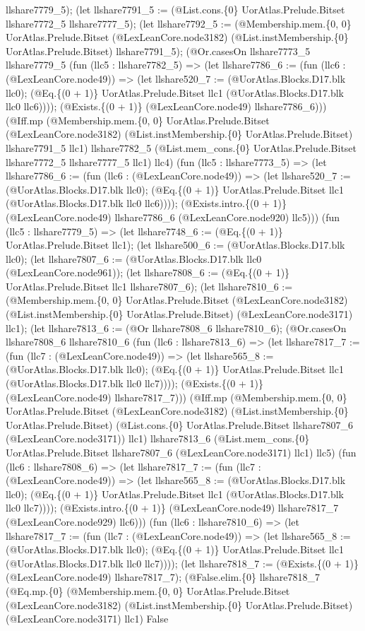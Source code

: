 \documentclass[11pt]{article}
\begin{document}
llshare7779\_5); (let llshare7791\_5 := (@List.cons.\{0\} UorAtlas.Prelude.Bitset llshare7772\_5 llshare7777\_5); (let llshare7792\_5 := (@Membership.mem.\{0, 0\} UorAtlas.Prelude.Bitset (@LexLeanCore.node3182) (@List.instMembership.\{0\} UorAtlas.Prelude.Bitset) llshare7791\_5); (@Or.casesOn llshare7773\_5 llshare7779\_5 (fun (llc5 : llshare7782\_5) => (let llshare7786\_6 := (fun (llc6 : (@LexLeanCore.node49)) => (let llshare520\_7 := (@UorAtlas.Blocks.D17.blk llc0); (@Eq.\{(0 + 1)\} UorAtlas.Prelude.Bitset llc1 (@UorAtlas.Blocks.D17.blk llc0 llc6)))); (@Exists.\{(0 + 1)\} (@LexLeanCore.node49) llshare7786\_6))) (@Iff.mp (@Membership.mem.\{0, 0\} UorAtlas.Prelude.Bitset (@LexLeanCore.node3182) (@List.instMembership.\{0\} UorAtlas.Prelude.Bitset) llshare7791\_5 llc1) llshare7782\_5 (@List.mem\_cons.\{0\} UorAtlas.Prelude.Bitset llshare7772\_5 llshare7777\_5 llc1) llc4) (fun (llc5 : llshare7773\_5) => (let llshare7786\_6 := (fun (llc6 : (@LexLeanCore.node49)) => (let llshare520\_7 := (@UorAtlas.Blocks.D17.blk llc0); (@Eq.\{(0 + 1)\} UorAtlas.Prelude.Bitset llc1 (@UorAtlas.Blocks.D17.blk llc0 llc6)))); (@Exists.intro.\{(0 + 1)\} (@LexLeanCore.node49) llshare7786\_6 (@LexLeanCore.node920) llc5))) (fun (llc5 : llshare7779\_5) => (let llshare7748\_6 := (@Eq.\{(0 + 1)\} UorAtlas.Prelude.Bitset llc1); (let llshare500\_6 := (@UorAtlas.Blocks.D17.blk llc0); (let llshare7807\_6 := (@UorAtlas.Blocks.D17.blk llc0 (@LexLeanCore.node961)); (let llshare7808\_6 := (@Eq.\{(0 + 1)\} UorAtlas.Prelude.Bitset llc1 llshare7807\_6); (let llshare7810\_6 := (@Membership.mem.\{0, 0\} UorAtlas.Prelude.Bitset (@LexLeanCore.node3182) (@List.instMembership.\{0\} UorAtlas.Prelude.Bitset) (@LexLeanCore.node3171) llc1); (let llshare7813\_6 := (@Or llshare7808\_6 llshare7810\_6); (@Or.casesOn llshare7808\_6 llshare7810\_6 (fun (llc6 : llshare7813\_6) => (let llshare7817\_7 := (fun (llc7 : (@LexLeanCore.node49)) => (let llshare565\_8 := (@UorAtlas.Blocks.D17.blk llc0); (@Eq.\{(0 + 1)\} UorAtlas.Prelude.Bitset llc1 (@UorAtlas.Blocks.D17.blk llc0 llc7)))); (@Exists.\{(0 + 1)\} (@LexLeanCore.node49) llshare7817\_7))) (@Iff.mp (@Membership.mem.\{0, 0\} UorAtlas.Prelude.Bitset (@LexLeanCore.node3182) (@List.instMembership.\{0\} UorAtlas.Prelude.Bitset) (@List.cons.\{0\} UorAtlas.Prelude.Bitset llshare7807\_6 (@LexLeanCore.node3171)) llc1) llshare7813\_6 (@List.mem\_cons.\{0\} UorAtlas.Prelude.Bitset llshare7807\_6 (@LexLeanCore.node3171) llc1) llc5) (fun (llc6 : llshare7808\_6) => (let llshare7817\_7 := (fun (llc7 : (@LexLeanCore.node49)) => (let llshare565\_8 := (@UorAtlas.Blocks.D17.blk llc0); (@Eq.\{(0 + 1)\} UorAtlas.Prelude.Bitset llc1 (@UorAtlas.Blocks.D17.blk llc0 llc7)))); (@Exists.intro.\{(0 + 1)\} (@LexLeanCore.node49) llshare7817\_7 (@LexLeanCore.node929) llc6))) (fun (llc6 : llshare7810\_6) => (let llshare7817\_7 := (fun (llc7 : (@LexLeanCore.node49)) => (let llshare565\_8 := (@UorAtlas.Blocks.D17.blk llc0); (@Eq.\{(0 + 1)\} UorAtlas.Prelude.Bitset llc1 (@UorAtlas.Blocks.D17.blk llc0 llc7)))); (let llshare7818\_7 := (@Exists.\{(0 + 1)\} (@LexLeanCore.node49) llshare7817\_7); (@False.elim.\{0\} llshare7818\_7 (@Eq.mp.\{0\} (@Membership.mem.\{0, 0\} UorAtlas.Prelude.Bitset (@LexLeanCore.node3182) (@List.instMembership.\{0\} UorAtlas.Prelude.Bitset) (@LexLeanCore.node3171) llc1) False 
\end{document}
